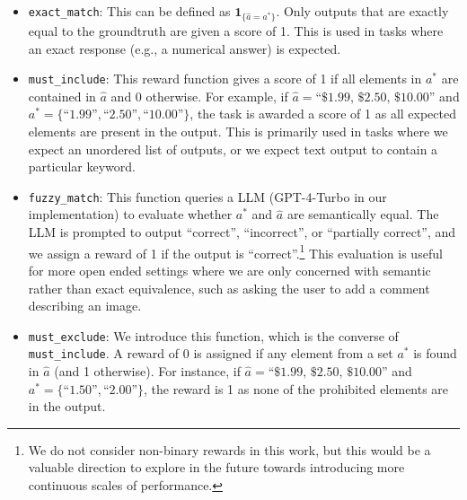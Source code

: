 \begin{itemize}
    \item \texttt{exact\_match}: This can be defined as $\mathbf{1}_{\{\hat{a} = a^*\}}$. 
    Only outputs that are exactly equal to the groundtruth are given a score of 1. This is used in tasks where an exact response (e.g., a numerical answer) is expected.
    \item \texttt{must\_include}: This reward function gives a score of 1 if all elements in $a^*$ are contained in $\hat{a}$ and 0 otherwise. For example, if $\hat{a} = \text{``\$1.99, \$2.50, \$10.00''}$ and $a^* = \{\text{``1.99''}, \text{``2.50''}, \text{``10.00''} \}$, the task is awarded a score of 1 as all expected elements are present in the output. This is primarily used in tasks where we expect an unordered list of outputs, or we expect text output to contain a particular keyword.
    \item \texttt{fuzzy\_match}: This function queries a LLM (GPT-4-Turbo in our implementation) to evaluate whether $a^*$ and $\hat{a}$ are semantically equal. The LLM is prompted to output ``correct'', ``incorrect'', or ``partially correct'', and we assign a reward of 1 if the output is ``correct''.\footnote{We do not consider non-binary rewards in this work, but this would be a valuable direction to explore in the future towards introducing more continuous scales of performance.} This evaluation is useful for more open ended settings where we are only concerned with semantic rather than exact equivalence, such as asking the user to add a comment describing an image.
    \item \texttt{must\_exclude}: We introduce this function, which is the converse of \texttt{must\_include}. A reward of 0 is assigned if any element from a set $a^*$ is found in $\hat{a}$ (and 1 otherwise). For instance, if $\hat{a} = \text{``\$1.99, \$2.50, \$10.00''}$ and $a^* = \{\text{``1.50''}, \text{``2.00''}\}$, the reward is 1 as none of the prohibited elements are in the output.
\end{itemize}

